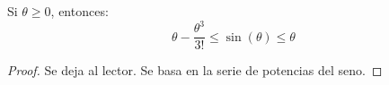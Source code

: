 \begin{lm}\label{lm:cota-seno}
    Si $\theta \geq 0$, entonces:
    $$
        \theta - \frac{\theta^3}{3!} \leq \sin(\theta) \leq \theta
    $$
\end{lm}
\begin{proof}
    Se deja al lector. Se basa en la serie de potencias del seno.
\end{proof}
